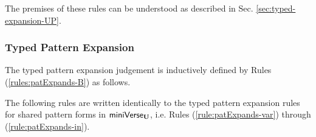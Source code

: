 The premises of these rules can be understood as described in Sec. \ref{sec:typed-expansion-UP}.%


\subsubsection{Typed Pattern Expansion}
The typed pattern expansion judgement is inductively defined by Rules (\ref{rules:patExpands-B}) as follows. %

The following rules are written identically to the typed pattern expansion rules for shared pattern forms in $\mathsf{miniVerse}_\textbf{U}$, i.e. Rules (\ref{rule:patExpands-var}) through (\ref{rule:patExpands-in}).
